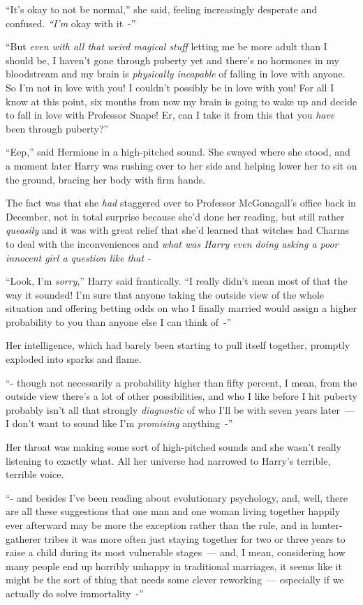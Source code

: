``It's okay to not be normal,'' she said, feeling increasingly desperate and confused. \emph{``I'm} okay with it~-''

``But \emph{even with all that weird magical stuff} letting me be more adult than I should be, I haven't gone through puberty yet and there's no hormones in my bloodstream and my brain is \emph{physically incapable} of falling in love with anyone. So I'm not in love with you! I couldn't possibly be in love with you! For all I know at this point, six months from now my brain is going to wake up and decide to fall in love with Professor Snape! Er, can I take it from this that you \emph{have} been through puberty?''

``Eep,'' said Hermione in a high-pitched sound. She swayed where she stood, and a moment later Harry was rushing over to her side and helping lower her to sit on the ground, bracing her body with firm hands.

The fact was that she \emph{had} staggered over to Professor McGonagall's office back in December, not in total surprise because she'd done her reading, but still rather \emph{queasily} and it was with great relief that she'd learned that witches had Charms to deal with the inconveniences and \emph{what was Harry even doing asking a poor innocent girl a question like that -}

``Look, I'm \emph{sorry},'' Harry said frantically. ``I really didn't mean most of that the way it sounded! I'm sure that anyone taking the outside view of the whole situation and offering betting odds on who I finally married would assign a higher probability to you than anyone else I can think of~-''

Her intelligence, which had barely been starting to pull itself together, promptly exploded into sparks and flame.

``- though not necessarily a probability higher than fifty percent, I mean, from the outside view there's a lot of other possibilities, and who I like before I hit puberty probably isn't all that strongly \emph{diagnostic} of who I'll be with seven years later~--- I don't want to sound like I'm \emph{promising} anything~-''

Her throat was making some sort of high-pitched sounds and she wasn't really listening to exactly what. All her universe had narrowed to Harry's terrible, terrible voice.

``- and besides I've been reading about evolutionary psychology, and, well, there are all these suggestions that one man and one woman living together happily ever afterward may be more the exception rather than the rule, and in hunter-gatherer tribes it was more often just staying together for two or three years to raise a child during its most vulnerable stages~--- and, I mean, considering how many people end up horribly unhappy in traditional marriages, it seems like it might be the sort of thing that needs some clever reworking~--- especially if we actually do solve immortality~-''

